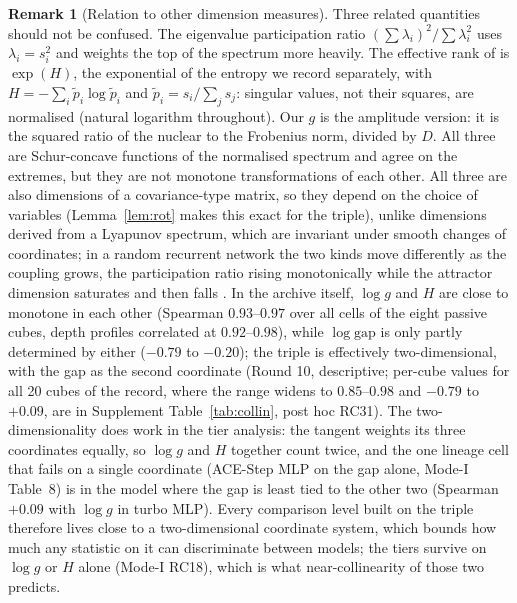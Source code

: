 \documentclass[11pt]{article}
\theoremstyle{definition}
\newtheorem{remark}[theorem]{Remark}
\newcommand{\gap}{\mathrm{gap}}
\begin{document}
\begin{remark}[Relation to other dimension measures]\label{rem:dims}
Three related quantities should not be confused. The eigenvalue participation ratio $(\sum\lambda_i)^2/\sum\lambda_i^2$ \citep{gao2017theory,recanatesi2022scaledependent} uses $\lambda_i=s_i^2$ and weights the top of the spectrum more heavily. The effective rank of \citet{roy2007effective} is $\exp(H)$, the exponential of the entropy we record separately, with $H=-\sum_i\tilde p_i\log\tilde p_i$ and $\tilde p_i=s_i/\sum_js_j$: singular values, not their squares, are normalised (natural logarithm throughout). Our $g$ is the amplitude version: it is the squared ratio of the nuclear to the Frobenius norm, divided by $D$. All three are Schur-concave functions of the normalised spectrum and agree on the extremes, but they are not monotone transformations of each other. All three are also dimensions of a covariance-type matrix, so they depend on the choice of variables (Lemma~\ref{lem:rot} makes this exact for the triple), unlike dimensions derived from a Lyapunov spectrum, which are invariant under smooth changes of coordinates; in a random recurrent network the two kinds move differently as the coupling grows, the participation ratio rising monotonically while the attractor dimension saturates and then falls \citep{clark2026lyapunov}. In the archive itself, $\log g$ and $H$ are close to monotone in each other (Spearman $0.93$--$0.97$ over all cells of the eight passive cubes, depth profiles correlated at $0.92$--$0.98$), while $\log\gap$ is only partly determined by either ($-0.79$ to $-0.20$); the triple is effectively two-dimensional, with the gap as the second coordinate (Round 10, descriptive; per-cube values for all 20 cubes of the record, where the range widens to $0.85$--$0.98$ and $-0.79$ to $+0.09$, are in Supplement Table~\ref{tab:collin}, post hoc RC31). The two-dimensionality does work in the tier analysis: the tangent weights its three coordinates equally, so $\log g$ and $H$ together count twice, and the one lineage cell that fails on a single coordinate (ACE-Step MLP on the gap alone, Mode-I Table~8) is in the model where the gap is least tied to the other two (Spearman $+0.09$ with $\log g$ in turbo MLP). Every comparison level built on the triple therefore lives close to a two-dimensional coordinate system, which bounds how much any statistic on it can discriminate between models; the tiers survive on $\log g$ or $H$ alone (Mode-I RC18), which is what near-collinearity of those two predicts.
\end{remark}
\end{document}

